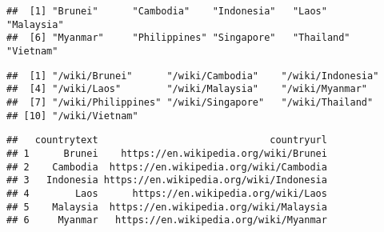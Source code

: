 \documentclass[]{article}
\newenvironment{Shaded}{\begin{snugshade}}{\end{snugshade}}
\newcommand{\KeywordTok}[1]{\textcolor[rgb]{0.13,0.29,0.53}{\textbf{#1}}}
\newcommand{\DataTypeTok}[1]{\textcolor[rgb]{0.13,0.29,0.53}{#1}}
\newcommand{\StringTok}[1]{\textcolor[rgb]{0.31,0.60,0.02}{#1}}
\newcommand{\OperatorTok}[1]{\textcolor[rgb]{0.81,0.36,0.00}{\textbf{#1}}}
\newcommand{\NormalTok}[1]{#1}
\begin{document}
\begin{verbatim}
##  [1] "Brunei"      "Cambodia"    "Indonesia"   "Laos"        "Malaysia"   
##  [6] "Myanmar"     "Philippines" "Singapore"   "Thailand"    "Vietnam"
\end{verbatim}

\begin{Shaded}
\end{Shaded}

\begin{verbatim}
##  [1] "/wiki/Brunei"      "/wiki/Cambodia"    "/wiki/Indonesia"  
##  [4] "/wiki/Laos"        "/wiki/Malaysia"    "/wiki/Myanmar"    
##  [7] "/wiki/Philippines" "/wiki/Singapore"   "/wiki/Thailand"   
## [10] "/wiki/Vietnam"
\end{verbatim}

\begin{Shaded}
\end{Shaded}

\begin{verbatim}
##   countrytext                              countryurl
## 1      Brunei    https://en.wikipedia.org/wiki/Brunei
## 2    Cambodia  https://en.wikipedia.org/wiki/Cambodia
## 3   Indonesia https://en.wikipedia.org/wiki/Indonesia
## 4        Laos      https://en.wikipedia.org/wiki/Laos
## 5    Malaysia  https://en.wikipedia.org/wiki/Malaysia
## 6     Myanmar   https://en.wikipedia.org/wiki/Myanmar
\end{verbatim}
\end{document}

